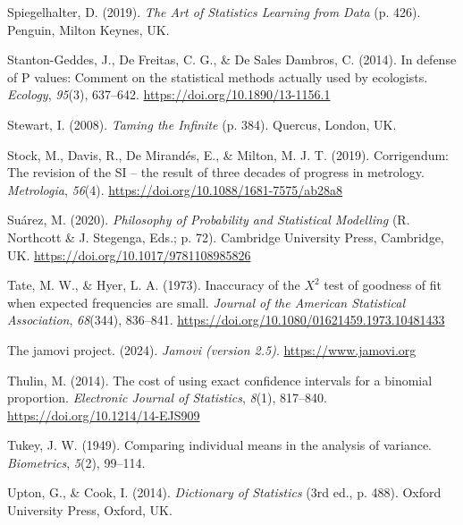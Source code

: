 \documentclass[
  openany]{krantz}
\newlength{\cslhangindent}
\newlength{\cslentryspacingunit} %
\newenvironment{CSLReferences}[2] %
 {%
  \setlength{\parindent}{0pt}
  \ifodd #1
  \let\oldpar\par
  \def\par{\hangindent=\cslhangindent\oldpar}
  \fi
  \setlength{\parskip}{#2\cslentryspacingunit}
 }%
 {}
\begin{document}
\begin{CSLReferences}{1}{0}
\leavevmode{}%
Spiegelhalter, D. (2019). \emph{{The Art of Statistics Learning from Data}} (p. 426). Penguin, Milton Keynes, UK.

\leavevmode{}%
Stanton-Geddes, J., De Freitas, C. G., \& De Sales Dambros, C. (2014). {In defense of P values: Comment on the statistical methods actually used by ecologists}. \emph{Ecology}, \emph{95}(3), 637--642. \url{https://doi.org/10.1890/13-1156.1}

\leavevmode{}%
Stewart, I. (2008). \emph{{Taming the Infinite}} (p. 384). Quercus, London, UK.

\leavevmode{}%
Stock, M., Davis, R., De Mirandés, E., \& Milton, M. J. T. (2019). Corrigendum: The revision of the SI -- the result of three decades of progress in metrology. \emph{Metrologia}, \emph{56}(4). \url{https://doi.org/10.1088/1681-7575/ab28a8}

\leavevmode{}%
Suárez, M. (2020). \emph{{Philosophy of Probability and Statistical Modelling}} (R. Northcott \& J. Stegenga, Eds.; p. 72). Cambridge University Press, Cambridge, UK. \url{https://doi.org/10.1017/9781108985826}

\leavevmode{}%
Tate, M. W., \& Hyer, L. A. (1973). Inaccuracy of the \(X^{2}\) test of goodness of fit when expected frequencies are small. \emph{Journal of the American Statistical Association}, \emph{68}(344), 836--841. \url{https://doi.org/10.1080/01621459.1973.10481433}

\leavevmode{}%
The jamovi project. (2024). \emph{Jamovi (version 2.5)}. \url{https://www.jamovi.org}

\leavevmode{}%
Thulin, M. (2014). {The cost of using exact confidence intervals for a binomial proportion}. \emph{Electronic Journal of Statistics}, \emph{8}(1), 817--840. \url{https://doi.org/10.1214/14-EJS909}

\leavevmode{}%
Tukey, J. W. (1949). {Comparing individual means in the analysis of variance}. \emph{Biometrics}, \emph{5}(2), 99--114.

\leavevmode{}%
Upton, G., \& Cook, I. (2014). \emph{{Dictionary of Statistics}} (3rd ed., p. 488). Oxford University Press, Oxford, UK.


\end{CSLReferences}
\end{document}
